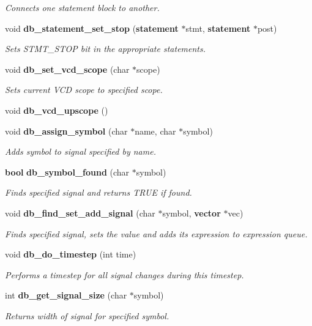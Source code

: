 \begin{CompactItemize}
\begin{CompactList}\small\item\em Connects one statement block to another.\item\end{CompactList}\item 
void {\bf db\_\-statement\_\-set\_\-stop} ({\bf statement} $\ast$stmt, {\bf statement} $\ast$post)
\begin{CompactList}\small\item\em Sets STMT\_\-STOP bit in the appropriate statements.\item\end{CompactList}\item 
void {\bf db\_\-set\_\-vcd\_\-scope} (char $\ast$scope)
\begin{CompactList}\small\item\em Sets current VCD scope to specified scope.\item\end{CompactList}\item 
void {\bf db\_\-vcd\_\-upscope} ()
\item 
void {\bf db\_\-assign\_\-symbol} (char $\ast$name, char $\ast$symbol)
\begin{CompactList}\small\item\em Adds symbol to signal specified by name.\item\end{CompactList}\item 
{\bf bool} {\bf db\_\-symbol\_\-found} (char $\ast$symbol)
\begin{CompactList}\small\item\em Finds specified signal and returns TRUE if found.\item\end{CompactList}\item 
void {\bf db\_\-find\_\-set\_\-add\_\-signal} (char $\ast$symbol, {\bf vector} $\ast$vec)
\begin{CompactList}\small\item\em Finds specified signal, sets the value and adds its expression to expression queue.\item\end{CompactList}\item 
void {\bf db\_\-do\_\-timestep} (int time)
\begin{CompactList}\small\item\em Performs a timestep for all signal changes during this timestep.\item\end{CompactList}\item 
int {\bf db\_\-get\_\-signal\_\-size} (char $\ast$symbol)
\begin{CompactList}\small\item\em Returns width of signal for specified symbol.\item\end{CompactList}\end{CompactItemize}
